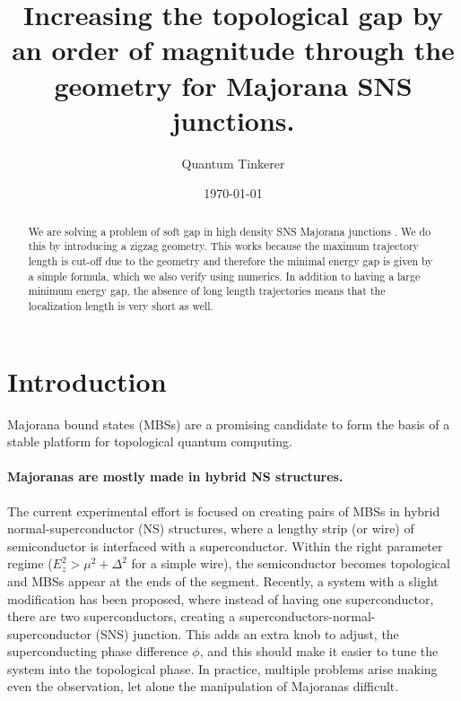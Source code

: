 \documentclass[english, twocolumn, 10pt, aps, superscriptaddress, floatfix, prb, citeautoscript]{revtex4-1}
\renewcommand{\comment}[2]{#2}
\renewcommand{\comment}{\paragraph}
\begin{document}
\title{Increasing the topological gap by an order of magnitude through the geometry for Majorana SNS junctions.}

\author{Quantum Tinkerer}

\date{\today}
\begin{abstract}
We are solving a problem of soft gap in high density SNS Majorana junctions \cite{pientka2017topological}.
We do this by introducing a zigzag geometry.
This works because the maximum trajectory length is cut-off due to the geometry and therefore the minimal energy gap is given by a simple formula, which we also verify using numerics.
In addition to having a large minimum energy gap, the absence of long length trajectories means that the localization length is very short as well.
\end{abstract}

\maketitle

\section{Introduction}
Majorana bound states (MBSs) are a promising candidate to form the basis of a stable platform for topological quantum computing.

\comment{Majoranas are mostly made in hybrid NS structures.}
The current experimental effort is focused on creating pairs of MBSs in hybrid normal-superconductor (NS) structures, where a lengthy strip (or wire) of semiconductor is interfaced with a \cite{lutchyn_majorana_2010,oreg_helical_2010} superconductor.
Within the right parameter regime ($E_z^2>\mu^2+\Delta^2$ for a simple wire), the semiconductor becomes topological and MBSs appear at the ends of the segment.
Recently, a system with a slight modification has been proposed\cite{pientka2017topological}, where instead of having one superconductor, there are two superconductors, creating a superconductors-normal-superconductor (SNS) junction.
This adds an extra knob to adjust, the superconducting phase difference $\phi$, and this should make it easier to tune the system into the topological phase.
In practice, multiple problems arise making even the observation, let alone the manipulation of Majoranas difficult.
\end{document}
